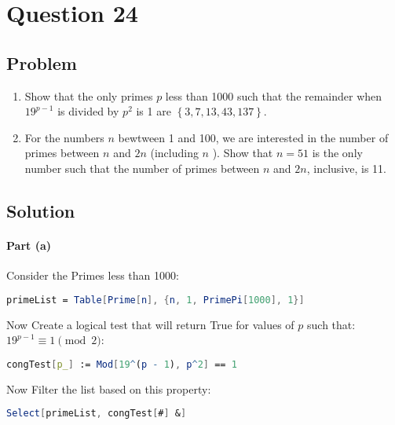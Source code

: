 \documentclass[12pt]{article}
\newenvironment{prob}[1][Problem]{%
	\sffamily \itshape   %
}{\endproof} %
\begin{document}
\section{Question 24}

\begin{prob}
  
\subsection{Problem}
\begin{enumerate}[label=\alph*.]
  \item Show that the only primes $p$ less than 1000 such that the remainder when $19^{p- 1}$ is divided by $p^2$ is 1 are $\left\{ 3, 7, 13, 43, 137 \right\}$.
  \item For the numbers $n$ bewtween 1 and 100, we are interested in the number of primes between $n$ and $2n$ (including $n$ ). Show that $n = 51$ is the only number such that the number of primes between $n$ and $2n$, inclusive, is 11.
\end{enumerate}
\end{prob}

\subsection{Solution}

\paragraph{Part (a)}

Consider the Primes less than 1000:

\begin{lstlisting}[language = Mathematica]
primeList = Table[Prime[n], {n, 1, PrimePi[1000], 1}]
\end{lstlisting}	

Now Create a logical test that will return True for values of $p$ such that: $19^{p-1} \equiv 1\pmod{2}$:
\begin{lstlisting}[language = Mathematica]
congTest[p_] := Mod[19^(p - 1), p^2] == 1
\end{lstlisting}	

Now Filter the list based on this property:

\begin{lstlisting}[language = Mathematica]
Select[primeList, congTest[#] &]
\end{lstlisting}	
\end{document}
